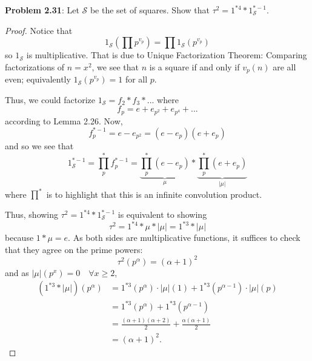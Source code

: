 \documentclass{article}
\begin{document}
\renewcommand{\S}{\mathcal{S}}

\textbf{Problem 2.31}: Let $\S$ be the set of squares. Show that $\tau^2 = 1^{*4} * 1_\S^{*-1}$.

\begin{proof}
Notice that
$$1_\S\left(\prod p^{v_p}\right) = \prod 1_\S(p^{v_p})$$
so $1_\S$ is multiplicative. That is due to Unique Factorization Theorem: Comparing factorizations of $n = x^2$, we see that $n$ is a square if and only if $v_p(n)$ are all even; equivalently $1_\S(p^{v_p}) = 1$ for all $p$.

Thus, we could factorize $1_\S = f_2 * f_3 * ...$ where
$$f_p = e + e_{p^2} + e_{p^4} + ...$$
according to Lemma 2.26. Now,
$$f_p^{*-1} = e - e_{p^2} = (e - e_p)(e + e_p)$$
and so we see that
$$1_\S^{*-1} = \prod_p^* f_p^{*-1} = \underbrace{\prod_p^* (e - e_p)}_{\mu} * \underbrace{\prod_p^{*} (e + e_p)}_{|\mu|}$$
where $\prod^*$ is to highlight that this is an infinite convolution product.

Thus, showing $\tau^2 = 1^{*4} * 1_\S^{*-1}$ is equivalent to showing
$$\tau^2 = 1^{*4} * \mu * |\mu| = 1^{*3} * |\mu|$$
because $1 * \mu = e$. As both sides are multiplicative functions, it suffices to check that they agree on the prime powers:
$$\tau^2(p^\alpha) = (\alpha + 1)^2$$
and as $|\mu|(p^x) = 0 \quad \forall x \geq 2$,
\begin{align*}
(1^{*3} * |\mu|)(p^\alpha) &= 1^{*3}(p^\alpha) \cdot |\mu|(1) + 1^{*3}(p^{\alpha-1}) \cdot |\mu|(p) \\
&= 1^{*3}(p^\alpha) + 1^{*3}(p^{\alpha-1})\\
&= \frac{(\alpha + 1)(\alpha + 2)}{2} + \frac{\alpha(\alpha + 1)}{2}\\
&= (\alpha + 1)^2.
\end{align*}
\end{proof}

\unless\ifdefined\IsMainDocument
\end{document}
